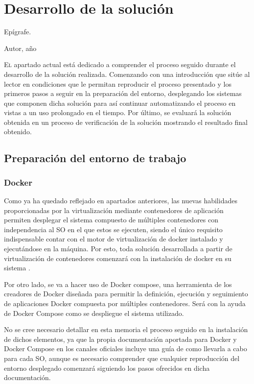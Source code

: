 \chapter{Desarrollo de la solución}\label{chp-04}
\epigraph{Epígrafe.}{Autor, año}

\lettrine[lraise=-0.1, lines=2, loversize=0.2]{E}{l} apartado actual está dedicado a comprender el proceso seguido durante el desarrollo de la solución realizada. Comenzando con una introducción que sitúe al lector en condiciones que le permitan reproducir el proceso presentado y los primeros pasos a seguir en la preparación del entorno, desplegando los sistemas que componen dicha solución para así continuar automatizando el proceso en vistas a un uso prolongado en el tiempo. Por último, se evaluará la solución obtenida en un proceso de verificación de la solución mostrando el resultado final obtenido.

\section{Preparación del entorno de trabajo}\label{preparacion}

\subsection{Docker}
Como ya ha quedado reflejado en apartados anteriores, las nuevas habilidades proporcionadas por la virtualización mediante contenedores de aplicación permiten desplegar el sistema compuesto de múltiples contenedores con independencia al \gls{SO} en el que estos se ejecuten, siendo el único requisito indispensable contar con el motor de virtualización de docker instalado y ejecutándose en la máquina. Por esto, toda solución desarrollada a partir de virtualización de contenedores comenzará con la instalación de docker en su sistema .

Por otro lado, se va a hacer uso de Docker compose, una herramienta de los creadores de Docker diseñada para permitir la definición, ejecución y seguimiento de aplicaciones Docker compuesta por múltiples contenedores. Será con la ayuda de Docker Compose como se despliegue el sistema utilizado.

No se cree necesario detallar en esta memoria el proceso seguido en la instalación de dichos elementos, ya que la propia documentación aportada para Docker\cite{dockerinstallation2017} y Docker Compose\cite{dockercomposeinstallation2017} en los canales oficiales incluye una guía de como llevarla a cabo para cada \gls{SO}, aunque es necesario comprender que cualquier reproducción del entorno desplegado comenzará siguiendo los pasos ofrecidos en dicha documentación.


